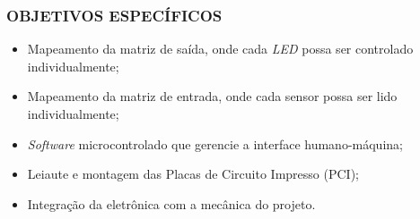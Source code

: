 \subsubsection{OBJETIVOS ESPECÍFICOS}
  \begin{itemize}
      \item Mapeamento da matriz de saída, onde cada \emph{LED} possa ser controlado individualmente;
      \item Mapeamento da matriz de entrada, onde cada sensor possa ser lido individualmente;
      \item \emph{Software} microcontrolado que gerencie a interface humano-máquina;
      \item Leiaute e montagem das Placas de Circuito Impresso (PCI);
      \item Integração da eletrônica com a mecânica do projeto.
  \end{itemize}
